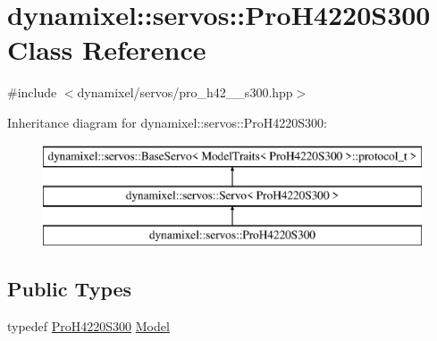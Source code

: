 \hypertarget{classdynamixel_1_1servos_1_1_pro_h4220_s300}{}\section{dynamixel\+:\+:servos\+:\+:Pro\+H4220\+S300 Class Reference}
\label{classdynamixel_1_1servos_1_1_pro_h4220_s300}


{\ttfamily \#include $<$dynamixel/servos/pro\+\_\+h42\+\_\+\_\+s300.\+hpp$>$}

Inheritance diagram for dynamixel\+:\+:servos\+:\+:Pro\+H4220\+S300\+:\begin{figure}[H]
\begin{center}
\leavevmode
\includegraphics[height=3.000000cm]{classdynamixel_1_1servos_1_1_pro_h4220_s300}
\end{center}
\end{figure}
\subsection*{Public Types}
\begin{DoxyCompactItemize}
\item 
typedef \hyperlink{classdynamixel_1_1servos_1_1_pro_h4220_s300}{Pro\+H4220\+S300} \hyperlink{classdynamixel_1_1servos_1_1_pro_h4220_s300_a38532488986a37a1cea8e0252f6157dc}{Model}
\end{DoxyCompactItemize}
